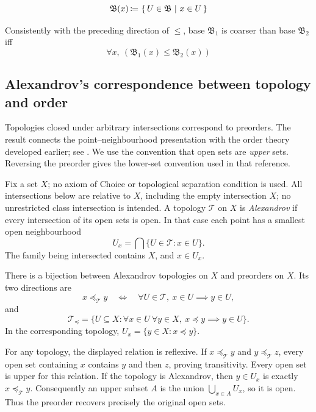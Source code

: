 \begin{notation}
\[
\mathfrak{B}(x)\,{\coloneqq}\, \left\{\,U\in\mathfrak{B}\ \middle|\ x\in U\,\right\}
\]
\end{notation}

\begin{definition}
Consistently with the preceding direction of $\leq$, base
$\mathfrak{B}_1$ is coarser than base $\mathfrak{B}_2$ iff
\[
\forall x ,\  (\mathfrak{B}_1(x) \leq \mathfrak{B}_2(x))
\]
\end{definition}

\subsection{Alexandrov's correspondence between topology and order}
Topologies closed under arbitrary intersections correspond to preorders.
The result connects the point--neighbourhood presentation with the order
theory developed earlier; see \cite[Section 1.6]{MayPishevarFiniteSpaces}.
We use the convention that open sets are \emph{upper} sets. Reversing
the preorder gives the lower-set convention used in that reference.

Fix a set $X$; no axiom of Choice or topological separation condition is used.
All intersections
below are relative to $X$, including
the empty intersection $X$; no unrestricted class intersection is intended.
A topology $\mathcal T$ on $X$ is \emph{Alexandrov} if every intersection
of its open sets is open. In that case each point has a smallest open
neighbourhood
\[
U_x=\bigcap\{U\in\mathcal T:x\in U\}.
\]
The family being intersected contains $X$, and $x\in U_x$.

\begin{theorem}
\label{thm:alexandrov_correspondence}
There is a bijection between Alexandrov topologies on $X$ and preorders
on $X$. Its two directions are
\[
x\preceq_{\mathcal T}y
\quad\Longleftrightarrow\quad
\forall U\in\mathcal T,\ x\in U\implies y\in U,
\]
and
\[
\mathcal T_{\preceq}
=\{U\subseteq X:\forall x\in U\ \forall y\in X,
                         \ x\preceq y\implies y\in U\}.
\]
In the corresponding topology, $U_x=\{y\in X:x\preceq y\}$.
\end{theorem}
\Proof
For any topology, the displayed relation is reflexive. If
$x\preceq_{\mathcal T}y$ and $y\preceq_{\mathcal T}z$, every open set
containing $x$ contains $y$ and then $z$, proving transitivity.
Every open set is upper for this relation. If the topology is Alexandrov,
then $y\in U_x$ is exactly $x\preceq_{\mathcal T}y$. Consequently an
upper subset $A$ is the union $\bigcup_{x\in A}U_x$, so it is open.
Thus the preorder recovers precisely the original open sets.

